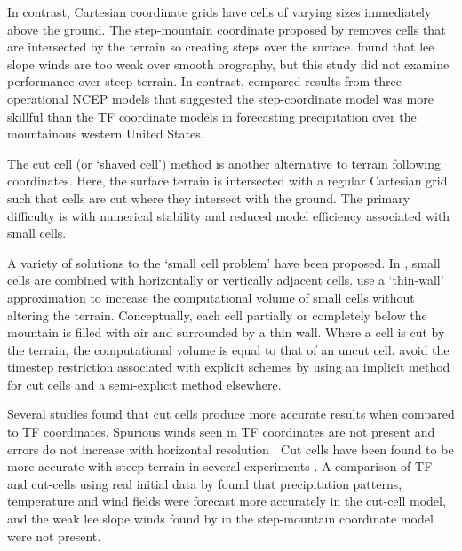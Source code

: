 In contrast, Cartesian coordinate grids have cells of varying sizes immediately above the ground.  The step-mountain coordinate proposed by \textcite{mesinger1988} removes cells that are intersected by the terrain so creating steps over the surface.    \textcite{gallus-klemp2000} found that lee slope winds are too weak over smooth orography, but this study did not examine performance over steep terrain.  In contrast, \textcite{mesinger2004} compared results from three operational NCEP models that suggested the step-coordinate model was more skillful than the TF coordinate models in forecasting precipitation over the mountainous western United States.


The cut cell (or `shaved cell')  method is another alternative to terrain following coordinates.  Here, the surface terrain is intersected with a regular Cartesian grid such that cells are cut where they intersect with the ground.   The primary difficulty is with numerical stability and reduced model efficiency associated with small cells. 

A variety of solutions to the `small cell problem' have been proposed.  In \textcite{yamazaki-satomura2010}, small cells are combined with horizontally or vertically adjacent cells.     \textcite{steppeler2002} use a `thin-wall' approximation to increase the computational volume of small cells without altering the terrain.  Conceptually, each cell partially or completely below the mountain is filled with air and surrounded by a thin wall.  Where a cell is cut by the terrain, the computational volume is equal to that of an uncut cell.  \textcite{jebens2011} avoid the timestep restriction associated with explicit schemes by using an implicit method for cut cells and a semi-explicit method elsewhere.

Several studies found that cut cells produce more accurate results when compared to TF coordinates.  Spurious winds seen in TF coordinates are not present and errors do not increase with horizontal resolution \autocite{good2013}.  Cut cells have been found to be more accurate with steep terrain in several experiments \parencites{good2013}{yamazaki-satomura2010}.  A comparison of TF and cut-cells using real initial data by \textcite{steppeler2006} found that precipitation patterns, temperature and wind fields were forecast more accurately in the cut-cell model, and the weak lee slope winds found by \textcite{gallus-klemp2000} in the step-mountain coordinate model were not present.  

